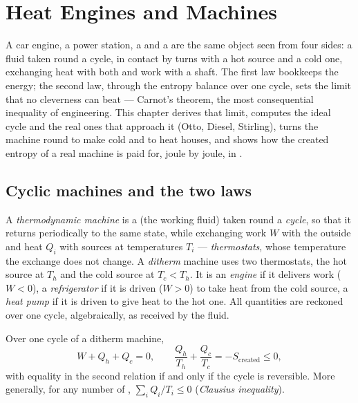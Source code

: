 \chapter{Heat Engines and Machines}\label{ch:b1:heat-engines}

A car engine, a power station, a  and a  are the
same object seen from four sides: a fluid taken round a cycle, in
contact by turns with a hot source and a cold one, exchanging heat with
both and work with a shaft. The first law bookkeeps the energy; the
second law, through the entropy balance over one cycle, sets the limit
that no cleverness can beat --- Carnot's theorem, the most consequential
inequality of engineering. This chapter derives that limit, computes
the ideal cycle and the real ones that approach it (Otto, Diesel,
Stirling), turns the machine round to make cold and to heat houses,
and shows how the created entropy of a real machine is paid for, joule
by joule, in .

\section{Cyclic machines and the two laws}

\begin{definition}\label{def:b1:heat-engines:machine}
A \emph{thermodynamic machine} is a  (the working fluid)
taken round a \emph{cycle}, so that it returns periodically to the same
state, while exchanging work $W$ with the outside and heat $Q_i$ with
sources at temperatures $T_i$ --- \emph{thermostats}, whose temperature
the exchange does not change. A \emph{ditherm} machine uses two
thermostats, the hot source at $T_h$ and the cold source at $T_c < T_h$.
It is an \emph{engine} if it delivers work ($W < 0$), a
\emph{refrigerator} if it is driven ($W > 0$) to take heat from the cold
source, a \emph{heat pump} if it is driven to give heat to the hot one.
All quantities are reckoned over one cycle, algebraically, as received
by the fluid.
\end{definition}

\begin{theorem}\label{thm:b1:heat-engines:clausius}
Over one cycle of a ditherm machine,
\[
W + Q_h + Q_c = 0 , \qquad
\frac{Q_h}{T_h} + \frac{Q_c}{T_c} = -S_{\mathrm{created}} \leq 0 ,
\]
with equality in the second relation if and only if the cycle is
reversible. More generally, for any number of ,
$\sum_i Q_i/T_i \leq 0$ (\emph{Clausius inequality}).
\end{theorem}

